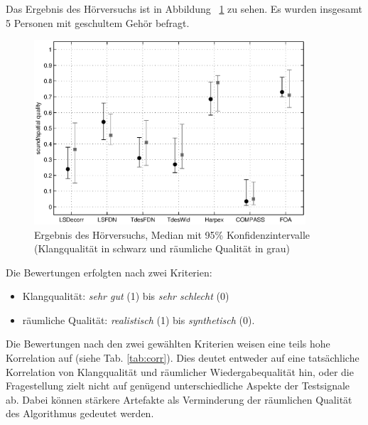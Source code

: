 Das Ergebnis des Hörversuchs ist in Abbildung ~\ref{fig:versuch} zu sehen. Es wurden insgesamt 5 Personen mit geschultem Gehör befragt.

\begin{figure}[!ht]
  \centering
  \includegraphics[width=0.9\textwidth]{ergebnis/plots/result.eps}
  \caption{Ergebnis des Hörversuchs, Median mit 95\% Konfidenzintervalle (Klangqualität in schwarz und räumliche Qualität in grau)}
  \label{fig:versuch}
\end{figure}

Die Bewertungen erfolgten nach zwei Kriterien:

\begin{itemize}
  \item Klangqualität: \textit{sehr gut} (1) bis \textit{sehr schlecht} (0)
  \item räumliche Qualität: \textit{realistisch} (1) bis \textit{synthetisch} (0).
\end{itemize}

Die Bewertungen nach den zwei gewählten Kriterien weisen eine teils hohe Korrelation auf (siehe Tab. \ref{tab:corr}). Dies deutet entweder auf eine tatsächliche Korrelation von Klangqualität und räumlicher Wiedergabequalität hin, oder die Fragestellung zielt nicht auf genügend unterschiedliche Aspekte der Testsignale ab. Dabei können stärkere Artefakte als Verminderung der räumlichen Qualität des Algorithmus gedeutet werden.

\begin{table}
\caption{Korrelationskoeffizient der Bewertungen nach den zwei Kriterien}
\label{tab:corr}
\end{table}
